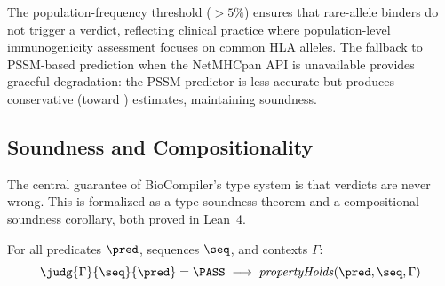 
\noindent The population-frequency threshold ($>5\%$) ensures that
rare-allele binders do not trigger a \FAIL{} verdict, reflecting
clinical practice where population-level immunogenicity assessment
focuses on common HLA alleles.
The fallback to PSSM-based prediction when the NetMHCpan API is
unavailable provides graceful degradation: the PSSM predictor is less
accurate but produces conservative (toward \FAIL{}) estimates,
maintaining soundness.

\subsection{Soundness and Compositionality}%
\label{sec:compositionality}

The central guarantee of BioCompiler's type system is that \PASS{}
verdicts are never wrong.
This is formalized as a type soundness theorem and a compositional
soundness corollary, both proved in Lean~4.

\begin{theorem}\label{thm:sound}
For all predicates $\pred$, sequences $\seq$, and contexts $\Gamma$:
\[
  \judg{\Gamma}{\seq}{\pred} = \PASS
  \;\longrightarrow\;
  \mathit{propertyHolds}(\pred, \seq, \Gamma)
\]
\end{theorem}

